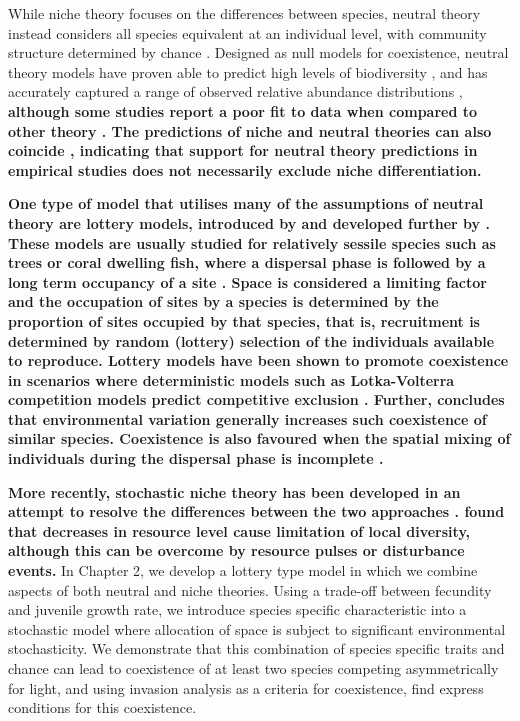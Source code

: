  While niche theory focuses on the differences between species, neutral theory instead considers all species equivalent at an individual level, with community structure determined by chance \citep[e.g.][]{hubbell1979tree,chave2004neutral,hubbell2001unified}. Designed as null models for coexistence, neutral theory models have proven able to predict high levels of biodiversity \citep[see ][ and references therein]{chave2004neutral,hubbell2001unified}, and has accurately captured a range of observed relative abundance distributions \citep[e.g.][]{volkov2003neutral},\textbf{ although some studies report a poor fit to data when compared to other theory \citep[e.g.][]{dornelas2006coral,mcgill2006empirical}. The predictions of niche and neutral theories can also coincide \citep{chisholm2010niche}, indicating that support for neutral theory predictions in empirical studies does not necessarily exclude niche differentiation.}
 
\textbf{One type of model that utilises many of the assumptions of neutral theory are lottery models, introduced by \cite{sale1978coexistence} and developed further by \cite{chesson1981environmental}. These models are usually studied for relatively sessile species such as trees or coral dwelling fish, where a dispersal phase is followed by a long term occupancy of a site \citep[e.g.][]{munday2004competitive}. Space is considered a limiting factor and the occupation of sites by a species is determined by the proportion of sites occupied by that species, that is, recruitment is determined by random (lottery) selection of the individuals available to reproduce. Lottery models have been shown to promote coexistence in scenarios where deterministic models such as Lotka-Volterra competition models predict competitive exclusion \citep[e.g.][]{chesson2000mechanisms}. Further, \cite{fagerstrom1988lotteries} concludes that environmental variation generally increases such coexistence of similar species. Coexistence is also favoured when the spatial mixing of individuals during the dispersal phase is incomplete \citep{muko2003incomplete,snyder2003local}.}

\textbf{More recently, stochastic niche theory has been developed in an attempt to resolve the differences between the two approaches \citep{tilman2004niche}. \citep{tilman2004niche} found that decreases in resource level cause limitation of local diversity, although this can be overcome by resource pulses or disturbance events. }In Chapter 2, we develop a lottery type model in which we combine aspects of both neutral and niche theories. Using a trade-off between fecundity and juvenile growth rate, we introduce species specific characteristic into a stochastic model where  allocation of space is subject to significant environmental stochasticity. We demonstrate that this combination of species specific traits and chance can lead to coexistence of at least two species competing asymmetrically for light, and using invasion analysis as a criteria for coexistence, find express conditions for this coexistence. 

